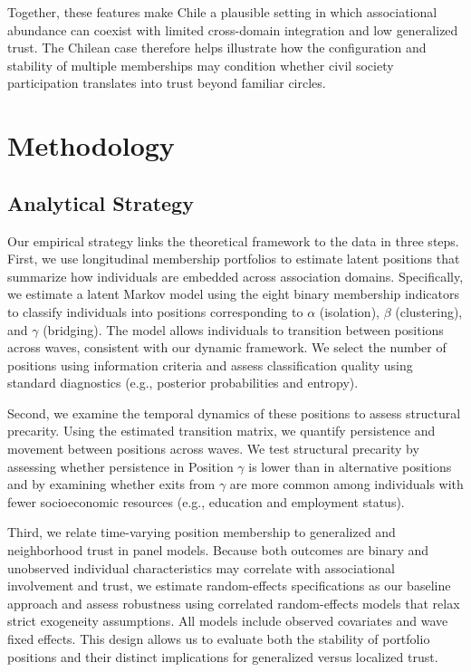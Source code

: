 Together, these features make Chile a plausible setting in which associational abundance can coexist with limited cross-domain integration and low generalized trust. The Chilean case therefore helps illustrate how the configuration and stability of multiple memberships may condition whether civil society participation translates into trust beyond familiar circles.


\section{Methodology}

\subsection{Analytical Strategy}

Our empirical strategy links the theoretical framework to the data in three steps. First, we use longitudinal membership portfolios to estimate latent positions that summarize how individuals are embedded across association domains. Specifically, we estimate a latent Markov model using the eight binary membership indicators to classify individuals into positions corresponding to $\alpha$ (isolation), $\beta$ (clustering), and $\gamma$ (bridging). The model allows individuals to transition between positions across waves, consistent with our dynamic framework. We select the number of positions using information criteria and assess classification quality using standard diagnostics (e.g., posterior probabilities and entropy).

Second, we examine the temporal dynamics of these positions to assess structural precarity. Using the estimated transition matrix, we quantify persistence and movement between positions across waves. We test structural precarity by assessing whether persistence in Position $\gamma$ is lower than in alternative positions and by examining whether exits from $\gamma$ are more common among individuals with fewer socioeconomic resources (e.g., education and employment status).

Third, we relate time-varying position membership to generalized and neighborhood trust in panel models. Because both outcomes are binary and unobserved individual characteristics may correlate with associational involvement and trust, we estimate random-effects specifications as our baseline approach \parencite{bell_fixed_2019} and assess robustness using correlated random-effects models that relax strict exogeneity assumptions. All models include observed covariates and wave fixed effects. This design allows us to evaluate both the stability of portfolio positions and their distinct implications for generalized versus localized trust.


